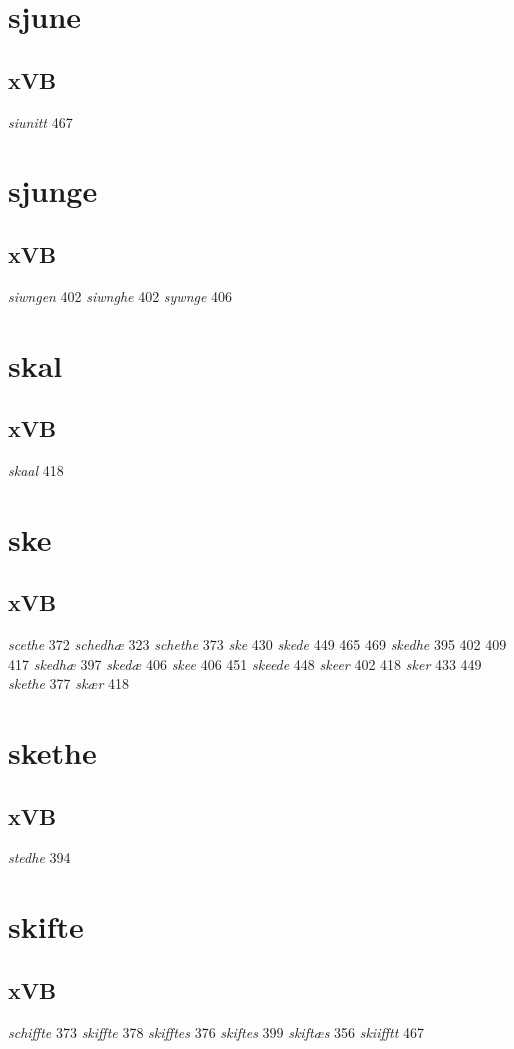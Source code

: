 \documentclass[a4paper,twocolumn]{article}
\begin{document}
\section{sjune}
\label{sec:orgc3c2c0a}
\subsection{xVB}
\label{sec:org5d462a1}
\emph{siunitt} 467 
\section{sjunge}
\label{sec:orgb253add}
\subsection{xVB}
\label{sec:orga6ed8de}
\emph{siwngen} 402 \emph{siwnghe} 402 \emph{sywnge} 406 
\section{skal}
\label{sec:org22f18f7}
\subsection{xVB}
\label{sec:orgfe3923a}
\emph{skaal} 418 
\section{ske}
\label{sec:org28b916d}
\subsection{xVB}
\label{sec:orgf856ab7}
\emph{scethe} 372 \emph{schedhæ} 323 \emph{schethe} 373 \emph{ske} 430 \emph{skede} 449 465 469 \emph{skedhe} 395 402 409 417 \emph{skedhæ} 397 \emph{skedæ} 406 \emph{skee} 406 451 \emph{skeede} 448 \emph{skeer} 402 418 \emph{sker} 433 449 \emph{skethe} 377 \emph{skær} 418 
\section{skethe}
\label{sec:org423e4c2}
\subsection{xVB}
\label{sec:orgc6f754c}
\emph{stedhe} 394 
\section{skifte}
\label{sec:orgacc0249}
\subsection{xVB}
\label{sec:orgca1160b}
\emph{schiffte} 373 \emph{skiffte} 378 \emph{skifftes} 376 \emph{skiftes} 399 \emph{skiftæs} 356 \emph{skiifftt} 467 
\end{document}
